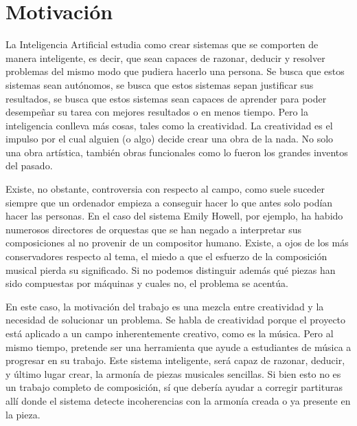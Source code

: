 \chapter{Motivación}
\minitoc
\label{chap:motivacion}

La Inteligencia Artificial estudia como crear sistemas que se comporten de manera inteligente, es decir, que sean capaces de razonar, deducir y resolver problemas del mismo modo que pudiera hacerlo una persona. Se busca que estos sistemas sean autónomos, se busca que estos sistemas sepan justificar sus resultados, se busca que estos sistemas sean capaces de aprender para poder desempeñar su tarea con mejores resultados o en menos tiempo. Pero la inteligencia conlleva más cosas, tales como la creatividad. La creatividad es el impulso por el cual alguien (o algo) decide crear una obra de la nada. No solo una obra artística, también obras funcionales como lo fueron los grandes inventos del pasado. 

Existe, no obstante, controversia con respecto al campo, como suele suceder siempre que un ordenador empieza a conseguir hacer lo que antes solo podían hacer las personas. En el caso del sistema Emily Howell, por ejemplo, ha habido numerosos directores de orquestas que se han negado a interpretar sus composiciones al no provenir de un compositor humano. Existe, a ojos de los más conservadores respecto al tema, el miedo a que el esfuerzo de la composición musical pierda su significado. Si no podemos distinguir además qué piezas han sido compuestas por máquinas y cuales no, el problema se acentúa. 

En este caso, la motivación del trabajo es una mezcla entre creatividad y la necesidad de solucionar un problema. Se habla de creatividad porque el proyecto está aplicado a un campo inherentemente creativo, como es la música. Pero al mismo tiempo, pretende ser una herramienta que ayude a estudiantes de música a progresar en su trabajo. Este sistema inteligente, será capaz de razonar, deducir, y último lugar crear, la armonía de piezas musicales sencillas. Si bien esto no es un trabajo completo de composición, sí que debería ayudar a corregir partituras allí donde el sistema detecte incoherencias con la armonía creada o ya presente en la pieza. 


